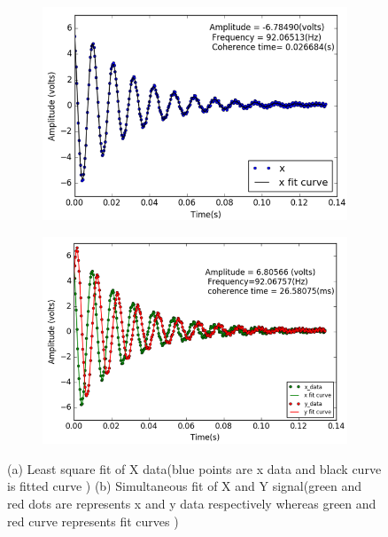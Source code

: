 \begin{itemize}
\begin{figure}
    \begin{subfigure}[b]{0.45\textwidth}
        \centering
        \includegraphics[width=\textwidth]{figures/fid_x_fit}
        \caption{}
        \label{fig:three sin x}
    \end{subfigure}
    \hfill
    \begin{subfigure}[b]{0.45\textwidth}
        \centering
        \includegraphics[width=\textwidth]{figures/fid_simultaneous}
        \caption{}
        \label{fig:five over x}
    \end{subfigure}
    \caption{(a) Least square fit of X data(blue points are x data and black curve is fitted curve ) (b) Simultaneous fit of X and Y signal(green and red dots are represents x and y data respectively whereas green and red curve represents fit curves ) }
    \label{fig:three graphs}
\end{figure}


\end{itemize}
